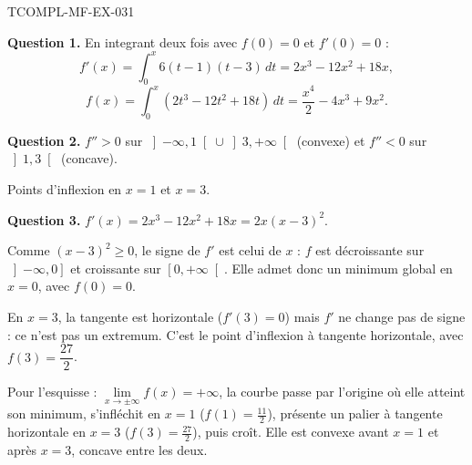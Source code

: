 \begin{corrige}{TCOMPL-MF-EX-031}

\textbf{Question 1.} En integrant deux fois avec $f(0)=0$ et $f'(0)=0$ :
\[ f'(x) = \int_0^x 6(t-1)(t-3)\,dt = 2x^3 - 12x^2 + 18x, \]
\[ f(x) = \int_0^x (2t^3 - 12t^2 + 18t)\,dt = \frac{x^4}{2} - 4x^3 + 9x^2. \]


\textbf{Question 2.} $f'' > 0$ sur $\left]-\infty, 1\right[ \cup \left]3, +\infty\right[$ (convexe) et $f'' < 0$ sur $\left]1, 3\right[$ (concave).

Points d'inflexion en $x = 1$ et $x = 3$.

\textbf{Question 3.} $f'(x) = 2x^3 - 12x^2 + 18x = 2x(x-3)^2$.

Comme $(x-3)^2 \geq 0$, le signe de $f'$ est celui de $x$ : $f$ est décroissante
sur $\left]-\infty,0\right]$ et croissante sur $\left[0,+\infty\right[$. Elle admet
donc un minimum global en $x=0$, avec $f(0)=0$.

En $x=3$, la tangente est horizontale ($f'(3)=0$) mais $f'$ ne change pas de
signe : ce n'est pas un extremum. C'est le point d'inflexion à tangente
horizontale, avec $f(3)=\dfrac{27}{2}$.

Pour l'esquisse : $\lim\limits_{x\to\pm\infty} f(x) = +\infty$, la courbe passe par
l'origine où elle atteint son minimum, s'infléchit en $x=1$ ($f(1)=\frac{11}{2}$),
présente un palier à tangente horizontale en $x=3$ ($f(3)=\frac{27}{2}$), puis
croît. Elle est convexe avant $x=1$ et après $x=3$, concave entre les deux.

\end{corrige}
